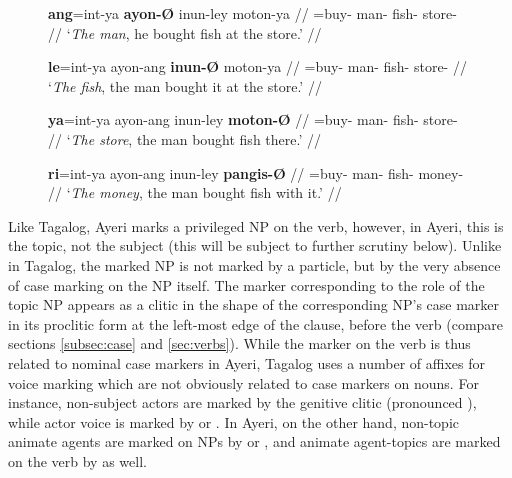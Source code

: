 \begin{figure}
\pex\label{ex:ayrmarking}
\a\label{ex:ayrmarking_at}\begingl
	\gla \textbf{ang}=int-ya \textbf{ayon-Ø} inun-ley moton-ya //
	\glb \AgtT{}=buy-\TsgM{} man-\Top{} fish-\PargI{} store-\Loc{} //
	\glft `\emph{The man}, he bought fish at the store.' //
\endgl

\a\label{ex:ayrmarking_pt}\begingl
	\gla \textbf{le}=int-ya ayon-ang \textbf{inun-Ø} moton-ya //
	\glb \PatTI{}=buy-\TsgM{} man-\Aarg{} fish-\Top{} store-\Loc{} //
	\glft `\emph{The fish}, the man bought it at the store.' //
\endgl

\a\label{ex:ayrmarking_loct}\begingl
	\gla \textbf{ya}=int-ya ayon-ang inun-ley \textbf{moton-Ø} //
	\glb \LocT{}=buy-\TsgM{} man-\Aarg{} fish-\PargI{} store-\Top{} //
	\glft `\emph{The store}, the man bought fish there.' //
\endgl

\a\label{ex:ayrmarking_inst}\begingl
	\gla \textbf{ri}=int-ya ayon-ang inun-ley \textbf{pangis-Ø} //
	\glb \InsT{}=buy-\TsgM{} man-\Aarg{} fish-\PargI{} money-\Top{} //
	\glft `\emph{The money}, the man bought fish with it.' //
\endgl


\xe
\end{figure}

Like Tagalog, Ayeri marks a privileged NP on the verb, however, in Ayeri, this
is the topic, not the subject (this will be subject to further scrutiny below).
Unlike in Tagalog, the marked NP is not marked by a particle, but by the very
absence of case marking on the NP itself. The marker corresponding to the role
of the topic NP appears as a clitic in the shape of the corresponding NP's case
marker in its proclitic form at the left-most edge of the clause, before the
verb (compare sections \ref{subsec:case} and \ref{sec:verbs}). While the marker
on the verb is thus related to nominal case markers in Ayeri, Tagalog uses a
number of affixes for voice marking which are not obviously related to case
markers on nouns. For instance, non-subject actors are marked by the genitive
clitic  (pronounced ), while actor voice is marked by 
or  \parencites[74, 78]{schachterotanes1972}[16--18]{kroeger1991}. In
Ayeri, on the other hand, non-topic animate agents are marked on NPs by
 or , and animate agent-topics are marked on
the verb by  as well.

